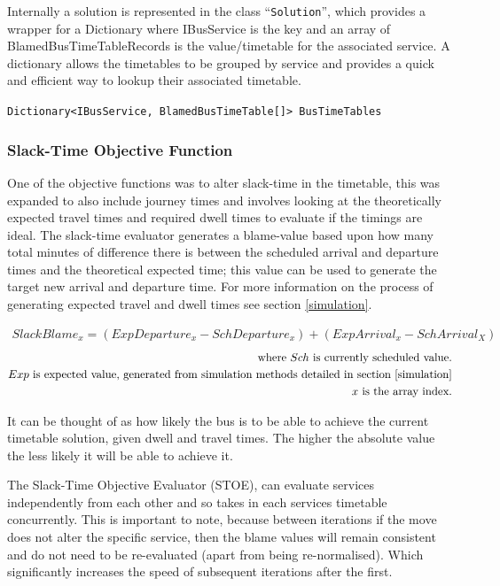 \documentclass{article}
\begin{document}
\par 
Internally a solution is represented in the class ``\texttt{Solution}'', which provides a wrapper for a Dictionary where IBusService is the key and an array of BlamedBusTimeTableRecords is the value/timetable for the associated service. A dictionary allows the timetables to be grouped by service and provides a quick and efficient way to lookup their associated timetable. 

\texttt{Dictionary<IBusService, BlamedBusTimeTable[]> BusTimeTables}


\subsubsection{Slack-Time Objective Function}
\label{STOE}
One of the objective functions was to alter slack-time in the timetable, this was expanded to also include journey times and involves looking at the theoretically expected travel times and required dwell times to evaluate if the timings are ideal. The slack-time evaluator generates a blame-value based upon how many total minutes of difference there is between the scheduled arrival and departure times and the theoretical expected time; this value can be used to generate the target new arrival and departure time. For more information on the process of generating expected travel and dwell times see section \ref{simulation}.


 
\begin{gather}
	\label{slackBlame}
	SlackBlame_x = (ExpDeparture_x - SchDeparture_x) + (ExpArrival_x - SchArrival_X) 
\end{gather}
\begin{align*}
	\text{where~$Sch$ is currently scheduled value.} \\
	\text{$Exp$ is expected value, generated from simulation methods detailed in section \ref{simulation}} \\
	\text{$x$ is the array index.} 
\end{align*}


\par 
It can be thought of as how likely the bus is to be able to achieve the current timetable solution, given dwell and travel times. The higher the absolute value the less likely it will be able to achieve it.

\par 
The Slack-Time Objective Evaluator (STOE), can evaluate services independently from each other and so takes in each services timetable concurrently. This is important to note, because between iterations if the move does not alter the specific service, then the blame values will remain consistent and do not need to be re-evaluated (apart from being re-normalised). Which significantly increases the speed of subsequent iterations after the first.
\end{document}
